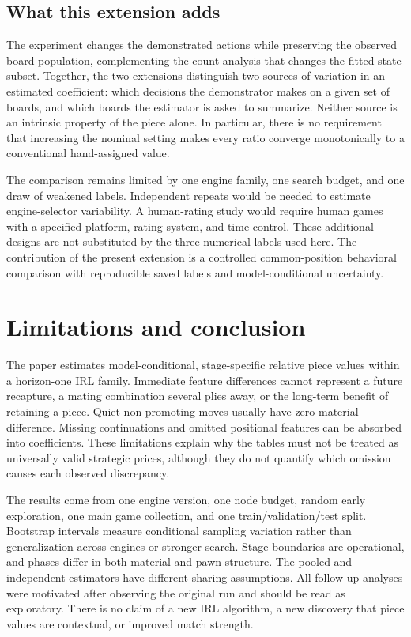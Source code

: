 \documentclass{jcst}
\begin{document}
\subsection{What this extension adds}
The experiment changes the demonstrated actions while preserving the observed board population, complementing the count analysis that changes the fitted state subset. Together, the two extensions distinguish two sources of variation in an estimated coefficient: which decisions the demonstrator makes on a given set of boards, and which boards the estimator is asked to summarize. Neither source is an intrinsic property of the piece alone. In particular, there is no requirement that increasing the nominal setting makes every ratio converge monotonically to a conventional hand-assigned value.

The comparison remains limited by one engine family, one search budget, and one draw of weakened labels. Independent repeats would be needed to estimate engine-selector variability. A human-rating study would require human games with a specified platform, rating system, and time control. These additional designs are not substituted by the three numerical labels used here. The contribution of the present extension is a controlled common-position behavioral comparison with reproducible saved labels and model-conditional uncertainty.

\section{Limitations and conclusion}
The paper estimates model-conditional, stage-specific relative piece values within a horizon-one IRL family. Immediate feature differences cannot represent a future recapture, a mating combination several plies away, or the long-term benefit of retaining a piece. Quiet non-promoting moves usually have zero material difference. Missing continuations and omitted positional features can be absorbed into coefficients. These limitations explain why the tables must not be treated as universally valid strategic prices, although they do not quantify which omission causes each observed discrepancy.

The results come from one engine version, one node budget, random early exploration, one main game collection, and one train/validation/test split. Bootstrap intervals measure conditional sampling variation rather than generalization across engines or stronger search. Stage boundaries are operational, and phases differ in both material and pawn structure. The pooled and independent estimators have different sharing assumptions. All follow-up analyses were motivated after observing the original run and should be read as exploratory. There is no claim of a new IRL algorithm, a new discovery that piece values are contextual, or improved match strength.
\end{document}
